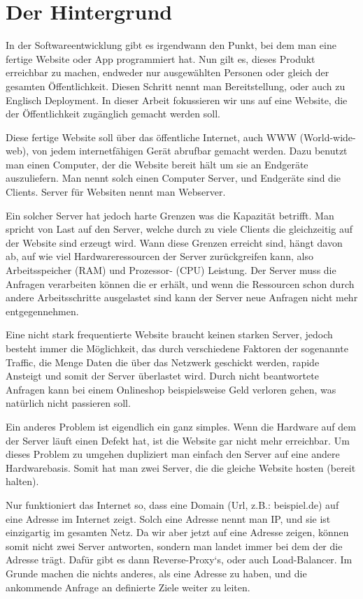 \newpage
\section{Der Hintergrund}
In der Softwareentwicklung gibt es irgendwann den Punkt, bei dem man eine fertige Website oder App programmiert hat. Nun gilt es, dieses Produkt erreichbar zu machen, endweder nur ausgewählten Personen oder gleich der gesamten Öffentlichkeit.
Diesen Schritt nennt man Bereitstellung, oder auch zu Englisch Deployment. In dieser Arbeit fokussieren wir uns auf eine Website, die der Öffentlichkeit zugänglich gemacht werden soll. 

Diese fertige Website soll über das öffentliche Internet, auch WWW (World-wide-web), von jedem internetfähigen Gerät abrufbar gemacht werden. Dazu benutzt man einen Computer,
der die Website bereit hält um sie an Endgeräte auszuliefern. Man nennt solch einen Computer Server, und Endgeräte sind die Clients. Server für Websiten nennt man Webserver.

Ein solcher Server hat jedoch harte Grenzen was die Kapazität betrifft. Man spricht von Last auf den Server, welche durch zu viele Clients die gleichzeitig auf der Website sind erzeugt wird.
Wann diese Grenzen erreicht sind, hängt davon ab, auf wie viel Hardwareressourcen der Server zurückgreifen kann, also Arbeitsspeicher (RAM) und Prozessor- (CPU) Leistung. Der Server muss die Anfragen
verarbeiten können die er erhält, und wenn die Ressourcen schon durch andere Arbeitsschritte ausgelastet sind kann der Server neue Anfragen nicht mehr entgegennehmen.

Eine nicht stark frequentierte Website braucht keinen starken Server, jedoch besteht immer die Möglichkeit, das durch verschiedene Faktoren der sogenannte Traffic, die Menge Daten die über das Netzwerk geschickt werden, rapide Ansteigt und 
somit der Server überlastet wird. Durch nicht beantwortete Anfragen kann bei einem Onlineshop beispielsweise Geld verloren gehen, was natürlich nicht passieren soll.

Ein anderes Problem ist eigendlich ein ganz simples. Wenn die Hardware auf dem der Server läuft einen Defekt hat, ist die Website gar nicht mehr erreichbar.
Um dieses Problem zu umgehen dupliziert man einfach den Server auf eine andere Hardwarebasis. Somit hat man zwei Server, die die gleiche Website hosten (bereit halten).

Nur funktioniert das Internet so, dass eine Domain (Url, z.B.: beispiel.de) auf eine Adresse im Internet zeigt. Solch eine Adresse nennt man IP, und sie ist einzigartig im gesamten Netz.
Da wir aber jetzt auf eine Adresse zeigen, können somit nicht zwei Server antworten, sondern man landet immer bei dem der die Adresse trägt.
Dafür gibt es dann Reverse-Proxy`s, oder auch Load-Balancer. Im Grunde machen die nichts anderes, als eine Adresse zu haben, und die ankommende Anfrage an definierte Ziele weiter zu leiten.

